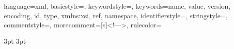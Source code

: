 {
    language=xml,
    basicstyle=\fontsize{9pt}{9pt}\selectfont\color{kommentgreen},
    keywordstyle=\color{lila},  	%
    keywords={name, value, version, encoding, id, type, xmlns:xsi, ref, namespace},
    identifierstyle=\color{black},  
    stringstyle=\color{blue},  
    commentstyle=\color{lightblue},
    morecomment=[s]{<!--}{-->},
    rulecolor=\color{black}
}
\renewcommand{\lstlistlistingname}{Quellcodeverzeichnis}
\renewcommand{\lstlistingname}{Quellcode}


\setlength{\headheight}{15pt}

\renewcommand{\chaptermark}[1]{ \markboth{#1}{} }

\fancyhf{}
\fancyhead[LE]{\thepage \ \ \ \ {\tiny \author, \today}}
\fancyhead[RO]{{\tiny \author, \today} \ \ \ \ \thepage}
\fancyhead[LO,RE]{\textit{\nouppercase{\leftmark}} }
\renewcommand{\headrulewidth}{0pt}

\graphicspath{{./figure/}}   %

\AtBeginDocument{\nocite{*}} %

\everymath{\displaystyle}    %


{3pt}                        %
{3pt}                        %
{\itshape}                   %
{}                           %
{\bfseries}                  %
{}                           %
{\newline}                   %
{}                           %
  
